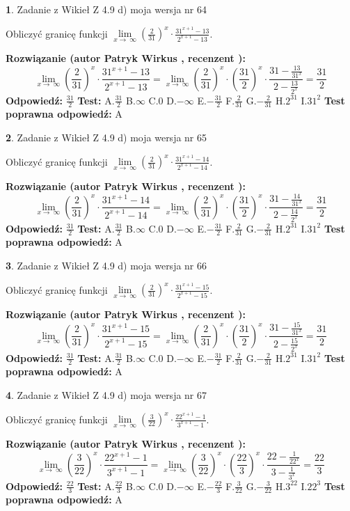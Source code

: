 \documentclass[12pt, a4paper]{article}
\theoremstyle{definition} %
\newtheorem{zad}{}
\newcommand{\zadStart}[1]{\begin{zad}#1\newline}
\newcommand{\zadStop}{\end{zad}}
\newcommand{\rozwStart}[2]{\noindent \textbf{Rozwiązanie (autor #1 , recenzent #2): }\newline}
\newcommand{\rozwStop}{\newline}
\newcommand{\odpStart}{\noindent \textbf{Odpowiedź:}\newline}
\newcommand{\odpStop}{\newline}
\newcommand{\testStart}{\noindent \textbf{Test:}\newline}
\newcommand{\testStop}{\newline}
\newcommand{\kluczStart}{\noindent \textbf{Test poprawna odpowiedź:}\newline}
\newcommand{\kluczStop}{\newline}
\begin{document}
\zadStart{Zadanie z Wikieł Z 4.9 d) moja wersja nr 64}


Obliczyć granicę funkcji  $\lim\limits_{x\to\ \infty}(\frac{2}{31})^{x}\cdot\frac{31^{x+1}-13}{2^{x+1}-13}$.
\zadStop
\rozwStart{Patryk Wirkus}{}
$$\lim\limits_{x\to\ \infty}(\frac{2}{31})^{x}\cdot\frac{31^{x+1}-13}{2^{x+1}-13}=\lim\limits_{x\to\ \infty}(\frac{2}{31})^{x}\cdot(\frac{31}{2})^{x} \cdot \frac{31-\frac{13}{31^{x}}}{2-\frac{13}{2^{x}}} = \frac{31}{2}$$
\rozwStop
\odpStart
$\frac{31}{2}$
\odpStop
\testStart
A.$\frac{31}{2}$ B.$\infty$ C.$0$ D.$-\infty$ E.$-\frac{31}{2}$
F.$\frac{2}{31}$ G.$-\frac{2}{31}$
H.$2^{31}$
I.$31^{2}$
\testStop
\kluczStart
A
\kluczStop



\zadStart{Zadanie z Wikieł Z 4.9 d) moja wersja nr 65}


Obliczyć granicę funkcji  $\lim\limits_{x\to\ \infty}(\frac{2}{31})^{x}\cdot\frac{31^{x+1}-14}{2^{x+1}-14}$.
\zadStop
\rozwStart{Patryk Wirkus}{}
$$\lim\limits_{x\to\ \infty}(\frac{2}{31})^{x}\cdot\frac{31^{x+1}-14}{2^{x+1}-14}=\lim\limits_{x\to\ \infty}(\frac{2}{31})^{x}\cdot(\frac{31}{2})^{x} \cdot \frac{31-\frac{14}{31^{x}}}{2-\frac{14}{2^{x}}} = \frac{31}{2}$$
\rozwStop
\odpStart
$\frac{31}{2}$
\odpStop
\testStart
A.$\frac{31}{2}$ B.$\infty$ C.$0$ D.$-\infty$ E.$-\frac{31}{2}$
F.$\frac{2}{31}$ G.$-\frac{2}{31}$
H.$2^{31}$
I.$31^{2}$
\testStop
\kluczStart
A
\kluczStop



\zadStart{Zadanie z Wikieł Z 4.9 d) moja wersja nr 66}


Obliczyć granicę funkcji  $\lim\limits_{x\to\ \infty}(\frac{2}{31})^{x}\cdot\frac{31^{x+1}-15}{2^{x+1}-15}$.
\zadStop
\rozwStart{Patryk Wirkus}{}
$$\lim\limits_{x\to\ \infty}(\frac{2}{31})^{x}\cdot\frac{31^{x+1}-15}{2^{x+1}-15}=\lim\limits_{x\to\ \infty}(\frac{2}{31})^{x}\cdot(\frac{31}{2})^{x} \cdot \frac{31-\frac{15}{31^{x}}}{2-\frac{15}{2^{x}}} = \frac{31}{2}$$
\rozwStop
\odpStart
$\frac{31}{2}$
\odpStop
\testStart
A.$\frac{31}{2}$ B.$\infty$ C.$0$ D.$-\infty$ E.$-\frac{31}{2}$
F.$\frac{2}{31}$ G.$-\frac{2}{31}$
H.$2^{31}$
I.$31^{2}$
\testStop
\kluczStart
A
\kluczStop



\zadStart{Zadanie z Wikieł Z 4.9 d) moja wersja nr 67}


Obliczyć granicę funkcji  $\lim\limits_{x\to\ \infty}(\frac{3}{22})^{x}\cdot\frac{22^{x+1}-1}{3^{x+1}-1}$.
\zadStop
\rozwStart{Patryk Wirkus}{}
$$\lim\limits_{x\to\ \infty}(\frac{3}{22})^{x}\cdot\frac{22^{x+1}-1}{3^{x+1}-1}=\lim\limits_{x\to\ \infty}(\frac{3}{22})^{x}\cdot(\frac{22}{3})^{x} \cdot \frac{22-\frac{1}{22^{x}}}{3-\frac{1}{3^{x}}} = \frac{22}{3}$$
\rozwStop
\odpStart
$\frac{22}{3}$
\odpStop
\testStart
A.$\frac{22}{3}$ B.$\infty$ C.$0$ D.$-\infty$ E.$-\frac{22}{3}$
F.$\frac{3}{22}$ G.$-\frac{3}{22}$
H.$3^{22}$
I.$22^{3}$
\testStop
\kluczStart
A
\kluczStop
\end{document}

